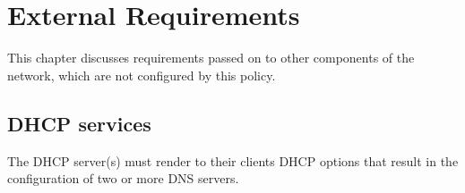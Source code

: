 %
%
%
\chapter{External Requirements}
\label{External_Requirements}

This chapter discusses requirements passed on to other components of the
network, which are not configured by this policy.

\section{DHCP services}

%
The DHCP server(s) must render to their clients DHCP options that result
in the configuration of two or more DNS servers.
